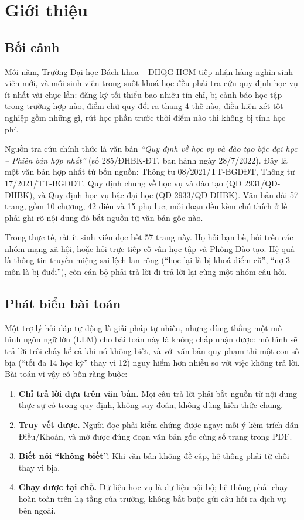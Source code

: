 \section{Giới thiệu}

\subsection{Bối cảnh}

Mỗi năm, Trường Đại học Bách khoa – ĐHQG-HCM tiếp nhận hàng nghìn sinh viên mới, và mỗi sinh
viên trong suốt khoá học đều phải tra cứu quy định học vụ ít nhất vài chục lần: đăng ký tối
thiểu bao nhiêu tín chỉ, bị cảnh báo học tập trong trường hợp nào, điểm chữ quy đổi ra thang 4
thế nào, điều kiện xét tốt nghiệp gồm những gì, rút học phần trước thời điểm nào thì không bị
tính học phí.

Nguồn tra cứu chính thức là văn bản \emph{“Quy định về học vụ và đào tạo bậc đại học – Phiên
bản hợp nhất”} (số 285/ĐHBK-ĐT, ban hành ngày 28/7/2022). Đây là một văn bản hợp nhất từ bốn
nguồn: Thông tư 08/2021/TT-BGDĐT, Thông tư 17/2021/TT-BGDĐT, Quy định chung về học vụ và đào
tạo (QĐ 2931/QĐ-ĐHBK), và Quy định học vụ bậc đại học (QĐ 2933/QĐ-ĐHBK). Văn bản dài 57 trang,
gồm 10 chương, 42 điều và 15 phụ lục; mỗi đoạn đều kèm chú thích ở lề phải ghi rõ nội dung đó
bắt nguồn từ văn bản gốc nào.

Trong thực tế, rất ít sinh viên đọc hết 57 trang này. Họ hỏi bạn bè, hỏi trên các nhóm mạng xã
hội, hoặc hỏi trực tiếp cố vấn học tập và Phòng Đào tạo. Hệ quả là thông tin truyền miệng sai
lệch lan rộng (“học lại là bị khoá điểm cũ”, “nợ 3 môn là bị đuổi”), còn cán bộ phải trả lời đi
trả lời lại cùng một nhóm câu hỏi.

\subsection{Phát biểu bài toán}

Một trợ lý hỏi đáp tự động là giải pháp tự nhiên, nhưng dùng thẳng một mô hình ngôn ngữ lớn
(LLM) cho bài toán này là không chấp nhận được: mô hình sẽ trả lời trôi chảy kể cả khi nó không
biết, và với văn bản quy phạm thì một con số bịa (“tối đa 14 học kỳ” thay vì 12) nguy hiểm hơn
nhiều so với việc không trả lời. Bài toán vì vậy có bốn ràng buộc:

\begin{enumerate}
  \item \textbf{Chỉ trả lời dựa trên văn bản.} Mọi câu trả lời phải bắt nguồn từ nội dung thực
  sự có trong quy định, không suy đoán, không dùng kiến thức chung.
  \item \textbf{Truy vết được.} Người đọc phải kiểm chứng được ngay: mỗi ý kèm trích dẫn
  Điều/Khoản, và mở được đúng đoạn văn bản gốc cùng số trang trong PDF.
  \item \textbf{Biết nói “không biết”.} Khi văn bản không đề cập, hệ thống phải từ chối thay vì
  bịa.
  \item \textbf{Chạy được tại chỗ.} Dữ liệu học vụ là dữ liệu nội bộ; hệ thống phải chạy hoàn
  toàn trên hạ tầng của trường, không bắt buộc gửi câu hỏi ra dịch vụ bên ngoài.
\end{enumerate}

